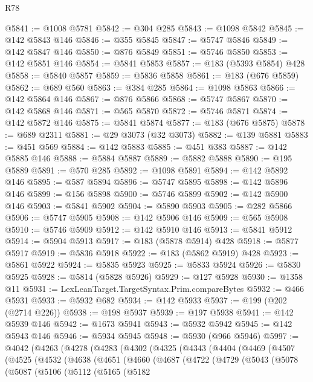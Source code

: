\begin{lexlean}{R78}
\begin{coremodule}
@5841 := @1008 @5781
@5842 := @304 @285
@5843 := @1098 @5842
@5845 := @142 @5843 @146
@5846 := @355 @5845
@5847 := @5747 @5846
@5849 := @142 @5847 @146
@5850 := @876 @5849
@5851 := @5746 @5850
@5853 := @142 @5851 @146
@5854 := @5841 @5853
@5857 := @183 (@5393 @5854) @428
@5858 := @5840 @5857
@5859 := @5836 @5858
@5861 := @183 (@676 @5859)
@5862 := @689 @560
@5863 := @384 @285
@5864 := @1098 @5863
@5866 := @142 @5864 @146
@5867 := @876 @5866
@5868 := @5747 @5867
@5870 := @142 @5868 @146
@5871 := @565 @5870
@5872 := @5746 @5871
@5874 := @142 @5872 @146
@5875 := @5841 @5874
@5877 := @183 (@676 @5875)
@5878 := @689 @2311
@5881 := @29 @3073 (@32 @3073)
@5882 := @139 @5881
@5883 := @451 @569
@5884 := @142 @5883
@5885 := @451 @383
@5887 := @142 @5885 @146
@5888 := @5884 @5887
@5889 := @5882 @5888
@5890 := @195 @5889
@5891 := @570 @285
@5892 := @1098 @5891
@5894 := @142 @5892 @146
@5895 := @587 @5894
@5896 := @5747 @5895
@5898 := @142 @5896 @146
@5899 := @156 @5898
@5900 := @5746 @5899
@5902 := @142 @5900 @146
@5903 := @5841 @5902
@5904 := @5890 @5903
@5905 := @282 @5866
@5906 := @5747 @5905
@5908 := @142 @5906 @146
@5909 := @565 @5908
@5910 := @5746 @5909
@5912 := @142 @5910 @146
@5913 := @5841 @5912
@5914 := @5904 @5913
@5917 := @183 (@5878 @5914) @428
@5918 := @5877 @5917
@5919 := @5836 @5918
@5922 := @183 (@5862 @5919) @428
@5923 := @5861 @5922
@5924 := @5835 @5923
@5925 := @5833 @5924
@5926 := @5830 @5925
@5928 := @5814 (@5828 @5926)
@5929 := @127 @5928
@5930 := @1358 @11
@5931 := LexLeanTarget.TargetSyntax.Prim.compareBytes
@5932 := @466 @5931
@5933 := @5932 @682
@5934 := @142 @5933
@5937 := @199 (@202 (@2714 @226))
@5938 := @198 @5937
@5939 := @197 @5938
@5941 := @142 @5939 @146
@5942 := @1673 @5941
@5943 := @5932 @5942
@5945 := @142 @5943 @146
@5946 := @5934 @5945
@5948 := @5930 (@966 @5946)
@5997 := @4042
    (@4263
      (@4278
        (@4283
          (@4302
            (@4325
              (@4343
                (@4404
                  (@4469
                    (@4507
                      (@4525
                        (@4532
                          (@4638
                            (@4651
                              (@4660
                                (@4687
                                  (@4722
                                    (@4729
                                      (@5043
                                        (@5078
                                          (@5087
                                            (@5106
                                              (@5112
                                                (@5165
                                                  (@5182

\end{coremodule}
\end{lexlean}
